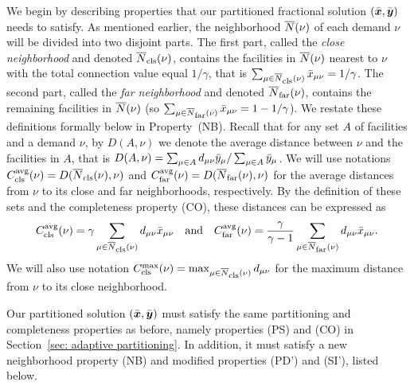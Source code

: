 We begin by describing properties that our partitioned fractional
solution $(\bar{\boldsymbol{x}},\bar{\boldsymbol{y}})$ needs to satisfy. As mentioned earlier,
the neighborhood ${\overline{N}}(\nu)$ of each demand $\nu$ will be divided
into two disjoint parts.  The first part, called the \emph{close
  neighborhood} and denoted ${\overline{N}}_{{\mbox{\scriptsize\rm cls}}}(\nu)$, contains the facilities
in ${\overline{N}}(\nu)$ nearest to $\nu$ with the total connection value
equal $1/\gamma$, that is $\sum_{\mu\in{\overline{N}}_{{\mbox{\scriptsize\rm cls}}}(\nu)} {\bar x}_{\mu\nu}
= 1/\gamma$.  The second part, called the \emph{far neighborhood} and
denoted ${\overline{N}}_{{\mbox{\scriptsize\rm far}}}(\nu)$, contains the remaining facilities in
${\overline{N}}(\nu)$ (so $\sum_{\mu\in{\overline{N}}_{{\mbox{\scriptsize\rm far}}}(\nu)} {\bar x}_{\mu\nu} = 1-1/\gamma$).  We
restate these definitions formally below in Property~(NB).  Recall
that for any set $A$ of facilities and a demand $\nu$, by
$D(A,\nu)$ we denote the average distance between $\nu$ and the
facilities in $A$, that is $D(A,\nu) =\sum_{\mu\in A}
d_{\mu\nu}{\bar y}_{\mu}/\sum_{\mu\in A} {\bar y}_{\mu}$.  We will use
notations $C_{{\mbox{\scriptsize\rm cls}}}^{{\mbox{\scriptsize\rm avg}}}(\nu)=D({\overline{N}}_{{\mbox{\scriptsize\rm cls}}}(\nu),\nu)$ and
$C_{{\mbox{\scriptsize\rm far}}}^{{\mbox{\scriptsize\rm avg}}}(\nu)=D({\overline{N}}_{{\mbox{\scriptsize\rm far}}}(\nu),\nu)$ for the average distances from
$\nu$ to its close and far neighborhoods, respectively.  By the
definition of these sets and the completeness property (CO), these
distances can be expressed as
%
\begin{equation*}
C_{{\mbox{\scriptsize\rm cls}}}^{{\mbox{\scriptsize\rm avg}}}(\nu)=\gamma\sum_{\mu\in{\overline{N}}_{{\mbox{\scriptsize\rm cls}}}(\nu)}
			d_{\mu\nu}{\bar x}_{\mu\nu} \quad\text{and}\quad
C_{{\mbox{\scriptsize\rm far}}}^{{\mbox{\scriptsize\rm avg}}}(\nu)=\frac{\gamma}{\gamma-1}\sum_{\mu\in{\overline{N}}_{{\mbox{\scriptsize\rm far}}}(\nu)}
d_{\mu\nu}{\bar x}_{\mu\nu}. 
\end{equation*}
%
We will also use
notation $C_{{\mbox{\scriptsize\rm cls}}}^{\max}(\nu)=\max_{\mu\in{\overline{N}}_{{\mbox{\scriptsize\rm cls}}}(\nu)} d_{\mu\nu}$ for
the maximum distance from $\nu$ to its close neighborhood.

Our partitioned solution $(\bar{\boldsymbol{x}},\bar{\boldsymbol{y}})$ must satisfy the same
partitioning and completeness properties as before, namely properties
(PS) and (CO) in Section~\ref{sec: adaptive partitioning}.  In
addition, it must satisfy a new neighborhood property (NB) and modified
properties (PD') and (SI'), listed below.

